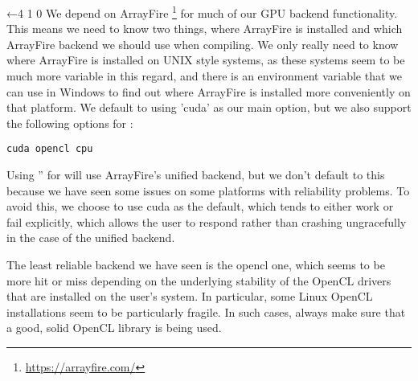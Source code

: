 \documentclass{article}%
\begin{document}
\nwenddocs{}\plusendmoddef\nwstartdeflinemarkup{}\nwenddeflinemarkup
{}←4 1 0
\eatline
{}\nwendcode{}\nwdocspar
\noindent
We depend on ArrayFire%
\footnote{\href{https://arrayfire.com/}{https://arrayfire.com/}}
for much of our GPU backend functionality.
This means we need to know two things,
where ArrayFire is installed
and which ArrayFire backend we should use when compiling.
We only really need to know where ArrayFire is installed on UNIX
style systems, as these systems seem to be much more variable in 
this regard, and there is an environment variable that we can use 
in Windows to find out where ArrayFire is installed more conveniently
on that platform.
We default to using {\Tt{}'cuda'\nwendquote} as our main option, but we also 
support the following options for {\Tt{}\nwendquote}:

\begin{verbatim}
cuda opencl cpu
\end{verbatim}

\noindent
Using {\Tt{}''\nwendquote} for {\Tt{}\nwendquote} will use ArrayFire's unified backend,
but we don't default to this because we have seen some issues on 
some platforms with reliability problems.
To avoid this, we choose to use {\Tt{}cuda\nwendquote} as the default,
which tends to either work or fail explicitly, 
which allows the user to respond rather than crashing 
ungracefully in the case of the unified backend.

The least reliable backend we have seen is the {\Tt{}opencl\nwendquote} one, 
which seems to be more hit or miss depending on the underlying
stability of the OpenCL drivers that are installed on the user's
system.
In particular, some Linux OpenCL installations seem to be 
particularly fragile.
In such cases, always make sure that a good, solid OpenCL library
is being used.
\end{document}
